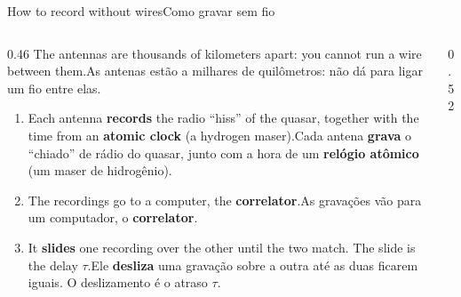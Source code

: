 \documentclass[aspectratio=169,11pt]{beamer}
\newcommand{\tr}[2]{\ifEN#2\else#1\fi}
\newcommand{\bnum}[1]{\textbf{\textcolor{mTeal}{#1}}}
\begin{document}
\begin{frame}{\tr{Como gravar sem fio}{How to record without wires}}
  \begin{columns}[T]
    \begin{column}{0.46\textwidth}
      \small
      \tr{As antenas estão a milhares de quilômetros: não dá para ligar um fio entre elas.}{The
      antennas are thousands of kilometers apart: you cannot run a wire between them.}
      \medskip
      \begin{enumerate}
        \setlength{\itemsep}{3pt}
        \item \tr{Cada antena \bnum{grava} o ``chiado'' de rádio do quasar, junto com a hora de
              um \bnum{relógio atômico} (um maser de hidrogênio).}{Each antenna \bnum{records} the
              radio ``hiss'' of the quasar, together with the time from an \bnum{atomic clock} (a
              hydrogen maser).}
        \item \tr{As gravações vão para um computador, o \bnum{correlator}.}{The recordings go to
              a computer, the \bnum{correlator}.}
        \item \tr{Ele \bnum{desliza} uma gravação sobre a outra até as duas ficarem iguais. O
              deslizamento é o atraso $\tau$.}{It \bnum{slides} one recording over the other
              until the two match. The slide is the delay $\tau$.}
      \end{enumerate}
    \end{column}
    \begin{column}{0.52\textwidth}
      \centering
    \end{column}
  \end{columns}
\end{frame}
\end{document}

